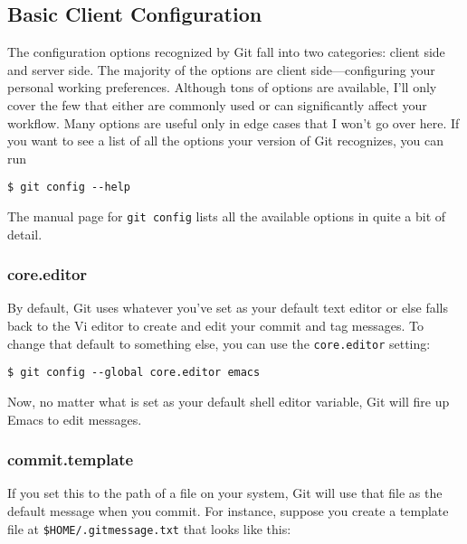 \documentclass[a4paper]{book}
\begin{document}
\subsection{Basic Client Configuration}\label{basic-client-configuration}

The configuration options recognized by Git fall into two categories: client side and server side. The majority of the options are client side---configuring your personal working preferences. Although tons of options are available, I'll only cover the few that either are commonly used or can significantly affect your workflow. Many options are useful only in edge cases that I won't go over here. If you want to see a list of all the options your version of Git recognizes, you can run

\begin{shaded}\begin{verbatim}
$ git config --help
\end{verbatim}\end{shaded}

The manual page for \texttt{git config} lists all the available options in quite a bit of detail.

\subsubsection{core.editor}

By default, Git uses whatever you've set as your default text editor or else falls back to the Vi editor to create and edit your commit and tag messages. To change that default to something else, you can use the \texttt{core.editor} setting:

\begin{shaded}\begin{verbatim}
$ git config --global core.editor emacs
\end{verbatim}\end{shaded}

Now, no matter what is set as your default shell editor variable, Git will fire up Emacs to edit messages.

\subsubsection{commit.template}

If you set this to the path of a file on your system, Git will use that file as the default message when you commit. For instance, suppose you create a template file at \texttt{\$HOME/.gitmessage.txt} that looks like this:
\end{document}
